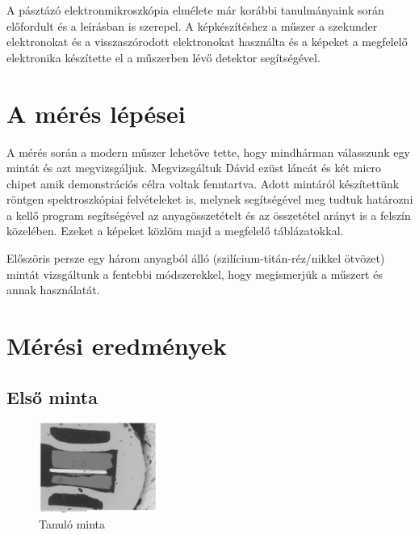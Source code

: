 \documentclass[a4paper,12pt]{article}
\begin{document}
\par A pásztázó elektronmikroszkópia elmélete már korábbi tanulmányaink során előfordult és a leírásban
is szerepel. A képkészítéshez a műszer a szekunder elektronokat és a visszaszórodott elektronokat használta
és a képeket a megfelelő elektronika készítette el a műszerben lévő detektor segítségével.

\section{A mérés lépései}

\par A mérés során a modern műszer lehetőve tette, hogy mindhárman válasszunk egy mintát és azt megvizsgáljuk.
Megvizsgáltuk Dávid ezüst láncát és két micro chipet amik demonstrációs célra voltak fenntartva. Adott mintáról
készítettünk röntgen spektroszkópiai felvételeket is, melynek segítségével meg tudtuk határozni a kellő program
segítségével az anyagösszetételt és az összetétel arányt is a felszín közelében. Ezeket a képeket közlöm majd a
megfelelő táblázatokkal.

\par Előszöris persze egy három anyagból álló (szilícium-titán-réz/nikkel ötvözet) mintát vizsgáltunk a fentebbi
módszerekkel, hogy megismerjük a műszert és annak használatát.

\vfill

\newpage

\section{Mérési eredmények}

\subsection{Első minta}

\begin{figure}[H]
	\centering
	\includegraphics[width=0.35\textwidth, height=0.25\textwidth]{Jcsop/elso.png}
	\caption{Tanuló minta}
\end{figure}
\end{document}
